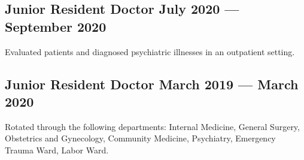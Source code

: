 \subsection{{Junior Resident Doctor \hfill July 2020 --- September 2020}}
\begin{zitemize}
\item Evaluated patients and diagnosed psychiatric illnesses in an outpatient setting.
\end{zitemize}

\subsection{{Junior Resident Doctor \hfill March 2019 --- March 2020}}
\begin{zitemize}
\item Rotated through the following departments: Internal Medicine, General Surgery, Obstetrics and Gynecology, Community Medicine, Psychiatry, Emergency Trauma Ward, Labor Ward.
\end{zitemize}
